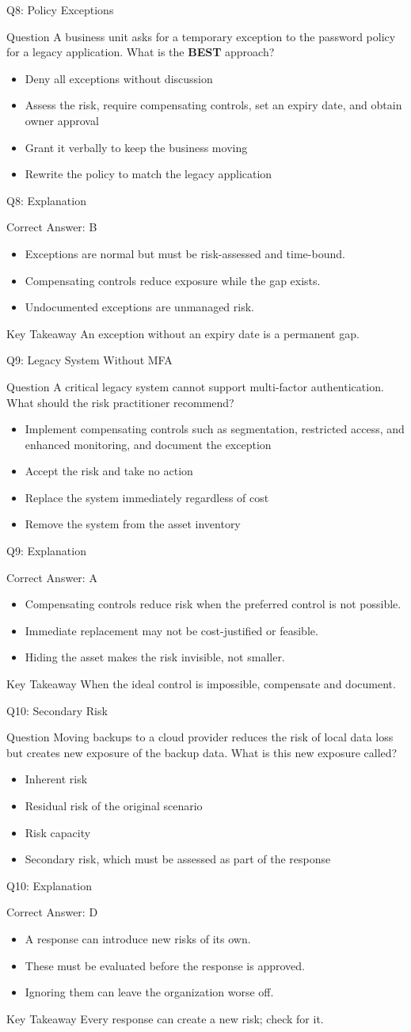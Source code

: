 \documentclass[aspectratio=169]{beamer}
\newcommand{\hq}[7]{%
	\begin{frame}{Q#1: #2}
		\begin{block}{Question}
			#3
		\end{block}
		\begin{itemize}
			#4
		\end{itemize}
	\end{frame}
	\begin{frame}{Q#1: Explanation}
		\begin{block}{Correct Answer: #5}
			\begin{itemize}
				#6
			\end{itemize}
		\end{block}
		\begin{alertblock}{Key Takeaway}
			#7
		\end{alertblock}
	\end{frame}
}
\begin{document}
	\hq{8}{Policy Exceptions}
	{A business unit asks for a temporary exception to the password policy for a legacy application. What is the \textbf{BEST} approach?}
	{\item[\textbf{(A)}] Deny all exceptions without discussion
		\item[\textbf{(B)}] Assess the risk, require compensating controls, set an expiry date, and obtain owner approval
		\item[\textbf{(C)}] Grant it verbally to keep the business moving
		\item[\textbf{(D)}] Rewrite the policy to match the legacy application}
	{B}
	{\item Exceptions are normal but must be risk-assessed and time-bound.
		\item Compensating controls reduce exposure while the gap exists.
		\item Undocumented exceptions are unmanaged risk.}
	{An exception without an expiry date is a permanent gap.}
	
	\hq{9}{Legacy System Without MFA}
	{A critical legacy system cannot support multi-factor authentication. What should the risk practitioner recommend?}
	{\item[\textbf{(A)}] Implement compensating controls such as segmentation, restricted access, and enhanced monitoring, and document the exception
		\item[\textbf{(B)}] Accept the risk and take no action
		\item[\textbf{(C)}] Replace the system immediately regardless of cost
		\item[\textbf{(D)}] Remove the system from the asset inventory}
	{A}
	{\item Compensating controls reduce risk when the preferred control is not possible.
		\item Immediate replacement may not be cost-justified or feasible.
		\item Hiding the asset makes the risk invisible, not smaller.}
	{When the ideal control is impossible, compensate and document.}
	
	\hq{10}{Secondary Risk}
	{Moving backups to a cloud provider reduces the risk of local data loss but creates new exposure of the backup data. What is this new exposure called?}
	{\item[\textbf{(A)}] Inherent risk
		\item[\textbf{(B)}] Residual risk of the original scenario
		\item[\textbf{(C)}] Risk capacity
		\item[\textbf{(D)}] Secondary risk, which must be assessed as part of the response}
	{D}
	{\item A response can introduce new risks of its own.
		\item These must be evaluated before the response is approved.
		\item Ignoring them can leave the organization worse off.}
	{Every response can create a new risk; check for it.}
	
\end{document}

